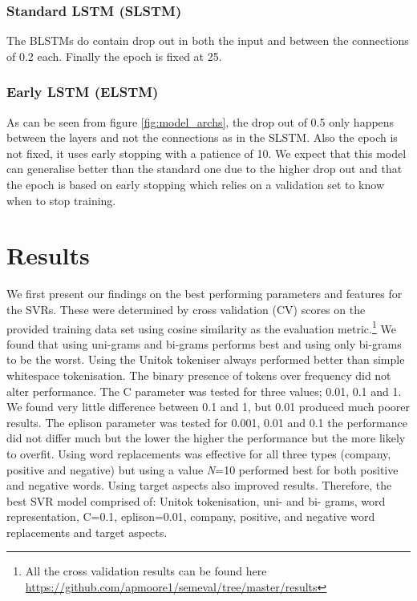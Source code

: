\documentclass[11pt,a4paper]{article}
\begin{document}
\subsubsection{Standard LSTM (SLSTM)}
The BLSTMs do contain drop out in both the input and between the connections of 0.2 each. Finally the epoch is fixed at 25.

\subsubsection{Early LSTM (ELSTM)}
As can be seen from figure \ref{fig:model_archs}, the drop out of 0.5 only happens between the layers and not the connections as in the SLSTM. Also the epoch is not fixed, it uses early stopping with a patience of 10. We expect that this model can generalise better than the standard one due to the higher drop out and that the epoch is based on early stopping which relies on a validation set to know when to stop training.

\section{Results}
\label{sec:results}
We first present our findings on the best performing parameters and features for the SVRs. These were determined by cross validation (CV) scores on the provided training data set using cosine similarity as the evaluation metric.\footnote{All the cross validation results can be found here \url{https://github.com/apmoore1/semeval/tree/master/results}} We found that using uni-grams and bi-grams performs best and using only bi-grams to be the worst. Using the Unitok tokeniser always performed better than simple whitespace tokenisation. The binary presence of tokens over frequency did not alter performance. The C parameter was tested for three values; 0.01, 0.1 and 1. We found very little difference between 0.1 and 1, but 0.01 produced much poorer results. The eplison parameter was tested for 0.001, 0.01 and 0.1 the performance did not differ much but the lower the higher the performance but the more likely to overfit. 
Using word replacements was effective for all three types (company, positive and negative) but using a value \textit{N}=10 performed best for both positive and negative words. 
Using target aspects also improved results. 
Therefore, the best SVR model comprised of: Unitok tokenisation, uni- and bi- grams, word representation, C=0.1, eplison=0.01, company, positive, and negative word replacements and target aspects.
\end{document}
